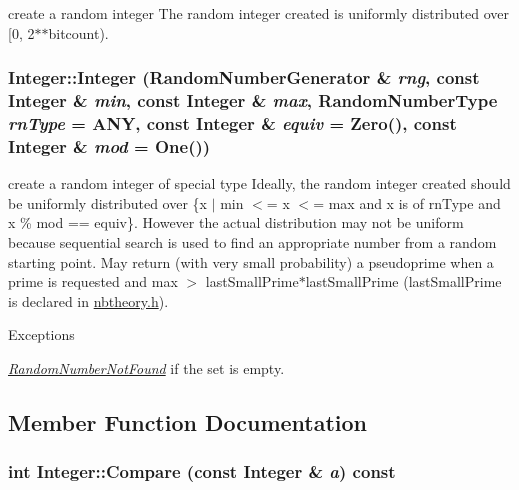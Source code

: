 create a random integer The random integer created is uniformly distributed over \mbox{[}0, 2$\ast$$\ast$bitcount). \hypertarget{class_integer_a88a110cb9f89a8810c228ad00cea18c2}{
\subsubsection[{Integer}]{\setlength{\rightskip}{0pt plus 5cm}Integer::Integer ({\bf RandomNumberGenerator} \& {\em rng}, \/  const {\bf Integer} \& {\em min}, \/  const {\bf Integer} \& {\em max}, \/  RandomNumberType {\em rnType} = {\ttfamily ANY}, \/  const {\bf Integer} \& {\em equiv} = {\ttfamily Zero()}, \/  const {\bf Integer} \& {\em mod} = {\ttfamily One()})}}
\label{class_integer_a88a110cb9f89a8810c228ad00cea18c2}


create a random integer of special type Ideally, the random integer created should be uniformly distributed over \{x $|$ min $<$= x $<$= max and x is of rnType and x \% mod == equiv\}. However the actual distribution may not be uniform because sequential search is used to find an appropriate number from a random starting point. May return (with very small probability) a pseudoprime when a prime is requested and max $>$ lastSmallPrime$\ast$lastSmallPrime (lastSmallPrime is declared in \hyperlink{nbtheory_8h_source}{nbtheory.h}). 
\begin{DoxyExceptions}{Exceptions}
\item[{\em \hyperlink{class_integer_1_1_random_number_not_found}{RandomNumberNotFound}}]if the set is empty. \end{DoxyExceptions}


\subsection{Member Function Documentation}
\hypertarget{class_integer_a550cf80410789dc459df82387792ed49}{
\subsubsection[{Compare}]{\setlength{\rightskip}{0pt plus 5cm}int Integer::Compare (const {\bf Integer} \& {\em a}) const}}
\label{class_integer_a550cf80410789dc459df82387792ed49}


